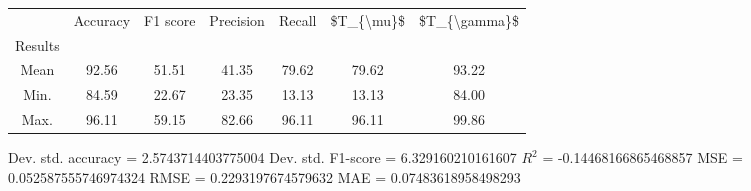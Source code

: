 \begin{tabular}{|c|c|c|c|c|c|c|}
\toprule
{} &  Accuracy &  F1 score &  Precision &  Recall &  \$T\_\{\textbackslash mu\}\$ &  \$T\_\{\textbackslash gamma\}\$ \\
Results &           &           &            &         &            &               \\
\hline
Mean    &     92.56 &     51.51 &      41.35 &   79.62 &      79.62 &         93.22 \\
Min.    &     84.59 &     22.67 &      23.35 &   13.13 &      13.13 &         84.00 \\
Max.    &     96.11 &     59.15 &      82.66 &   96.11 &      96.11 &         99.86 \\
\bottomrule
\end{tabular}

 Dev. std. accuracy = 2.5743714403775004
 Dev. std. F1-score = 6.329160210161607
 $R^2$ = -0.14468166865468857
 MSE = 0.052587555746974324
 RMSE = 0.2293197674579632
 MAE = 0.07483618958498293